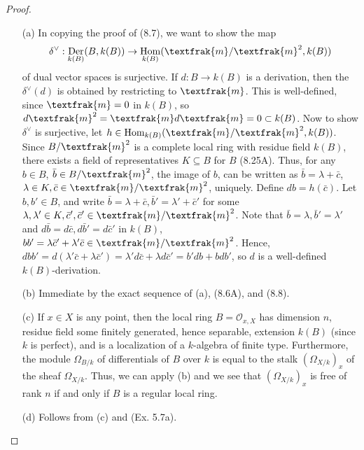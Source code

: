 \documentclass{article}
\newcommand{\goth}[1]{\textfrak{#1}}
\newcommand{\fO}{\mathcal{O}}
\newcommand{\gm}{\goth{m}}
\DeclareMathOperator{\Hom}{Hom}
\DeclareMathOperator{\Der}{Der}
\begin{document}
\begin{enumerate} [label=\textbf{\arabic*.}, leftmargin=0em]
\begin{proof} $ $ \vspace{0pt}
\begin{itemize} [leftmargin=0cm]
\item[(a)] In copying the proof of (8.7), we want to show the map
\begin{equation*}
    \delta^\vee : \Der_{k(B)}(B, k(B)) \to \Hom_{k(B)}(\gm/\gm^2, k(B))
\end{equation*}
of dual vector spaces is surjective. If $d : B \to k(B)$ is a derivation, then the $\delta^\vee(d)$ is obtained by restricting to $\goth{m}$. This is well-defined, since $\goth{m} = 0$ in $k(B)$, so $d\gm^2 = \gm d\gm = 0 \subset k(B)$. Now to show $\delta^\vee$ is surjective, let $h \in \Hom_{k(B)}(\gm/\gm^2, k(B))$. Since $B / \gm^2$ is a complete local ring with residue field $k(B)$, there exists a field of representatives $K \subseteq B$ for $B$ (8.25A). Thus, for any $b \in B$, $\bar{b} \in B / \gm^2$, the image of $b$, can be written as $\bar{b} = \lambda + \bar{c}$, $\lambda \in K, \bar{c} \in \gm/\gm^2$, uniquely. Define $db = h(\bar{c})$. Let $b, b' \in B$, and write $\bar{b} = \lambda + \bar{c}, \bar{b}' = \lambda' + \bar{c}'$ for some $\lambda, \lambda' \in K, \bar{c}', \bar{c}' \in \gm/\gm^2$. Note that $\bar{b} = \lambda, \bar{b}' = \lambda'$ and $d\bar{b} = d\bar{c}, d\bar{b}' = d\bar{c}'$ in $k(B)$, $bb' = \lambda \bar{c}' + \lambda' \bar{c} \in \gm/\gm^2$. Hence, $dbb' = d(\lambda' \bar{c} + \lambda \bar{c}') = \lambda' d\bar{c} + \lambda d\bar{c}' = b'db + bdb'$, so $d$ is a well-defined $k(B)$-derivation.

\item[(b)] Immediate by the exact sequence of (a), (8.6A), and (8.8).

\item[(c)] If $x \in X$ is any point, then the local ring $B = \fO_{x, X}$ has dimension $n$, residue field some finitely generated, hence separable, extension $k(B)$ (since $k$ is perfect), and is a localization of a $k$-algebra of finite type. Furthermore, the module $\Omega_{B/k}$ of differentials of $B$ over $k$ is equal to the stalk $(\Omega_{X/k})_x$ of the sheaf $\Omega_{X/k}$. Thus, we can apply (b) and we see that $(\Omega_{X/k})_x$ is free of rank $n$ if and only if $B$ is a regular local ring.

\item[(d)] Follows from (c) and (Ex. 5.7a).

\end{itemize} 
\end{proof}


\end{enumerate}
\end{document}
